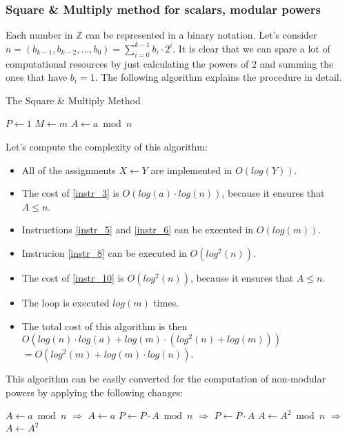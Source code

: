 \documentclass[12pt, a4paper, english]{report}
\begin{document}
\subsubsection{Square \& Multiply method for scalars, modular powers}
Each number in $\mathbb{Z}$ can be represented in a binary notation. \newline
Let's consider $n = (b_{k-1}, b_{k-2}, \dots, b_{0}) = \sum_{i=0}^{k-1} b_{i} \cdot 2^{i}$. \newline
It is clear that we can spare a lot of computational resources by just calculating the powers of 2 and summing the ones that have $b_{i} = 1$. The following algorithm explains the procedure in detail.
\begin{algorithm}
\caption{The Square \& Multiply Method}\label{alg:SquareMultiply}
$P \gets 1$\;
$M \gets m$\;
$A \gets a \bmod n$\;\label{instr_3}
\end{algorithm}
Let's compute the complexity of this algorithm:
\begin{itemize}
    \item All of the assignments $X \gets Y$ are implemented in $O(log(Y))$.
    \item The cost of \ref{instr_3} is $O(log(a) \cdot log(n))$, because it ensures that $A \leq n$.
    \item Instructions \ref{instr_5} and \ref{instr_6} can be executed in $O(log(m))$.
    \item Instrucion \ref{instr_8} can be executed in $O(log^{2}(n))$.
    \item The cost of \ref{instr_10} is $O(log^{2}(n))$, because it ensures that $A \leq n$.
    \item The loop is executed $log(m)$ times.
    \item The total cost of this algorithm is then $O(log(n) \cdot log(a) + log(m) \cdot (log^{2}(n) + log(m)))$ \\ $= O(log^{2}(m) + log(m) \cdot log(n))$.
\end{itemize}
This algorithm can be easily converted for the computation of non-modular powers by applying the following changes:
\begin{algorithm}
    $A \gets a \bmod n$ $\Longrightarrow$ $A \gets a$\;\label{instr_3a}
    $P \gets P \cdot A \bmod n$ $\Longrightarrow$ $P \gets P \cdot A$\;\label{instr_8a}
    $A \gets A^{2} \bmod n$ $\Longrightarrow$ $A \gets A^{2}$\;\label{instr_10a}
\end{algorithm}
\end{document}
